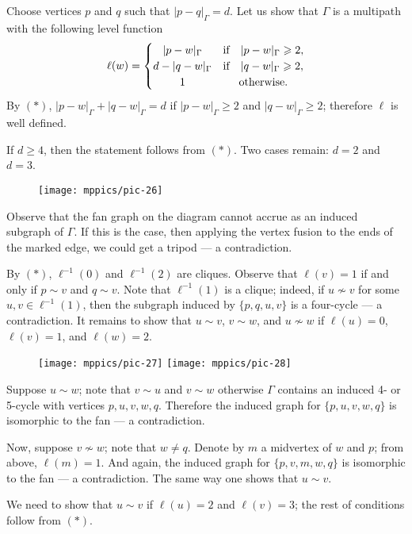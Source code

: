 \documentclass{article}
\def\parit#1{\medskip\noindent{\it #1}}
\begin{document}
Choose vertices $p$ and $q$ such that $|p-q|_\Gamma=d$.
Let us show that $\Gamma$ is a multipath with the following level function
\[\ell(w)=
\begin{cases}
\hfil |p-w|_\Gamma&\text{if}\quad |p-w|_\Gamma\geqslant 2,
\\
d-|q-w|_\Gamma&\text{if}\quad |q-w|_\Gamma\geqslant 2,
\\
\hfil 1&\hfil\text{otherwise.}
\end{cases}
\]
By $({*})$, $|p-w|_\Gamma+|q-w|_\Gamma=d$ if $|p-w|_\Gamma\geqslant 2$ and $|q-w|_\Gamma\geqslant 2$;
therefore $\ell$ is well defined.

If $d\geqslant 4$, then the statement follows from $({*})$.
Two cases remain: $d=2$ and $d=3$.

\begin{wrapfigure}{r}{17 mm}
\vskip-6mm
\centering
\texttt{[image: mppics/pic-26]}
\vskip-2mm
\end{wrapfigure}

Observe that the fan graph on the diagram cannot accrue as an induced subgraph of $\Gamma$.
If this is the case, then applying the vertex fusion to the ends of the marked edge, we could get a tripod --- a contradiction.

\parit{Case $d=2$.}
By $({*})$, $\ell^{-1}(0)$ and $\ell^{-1}(2)$ are cliques.
Observe that $\ell(v)=1$ if and only if $p\sim v$ and $q\sim v$.
Note that $\ell^{-1}(1)$ is a clique;
indeed, if $u\nsim v$ for some $u,v\in\ell^{-1}(1)$,
then the subgraph induced by $\{p,q,u,v\}$ is a four-cycle --- a contradiction.
It remains to show that $u\sim v$, $v\sim w$, and $u\nsim w$ if $\ell(u)=0$, $\ell(v)=1$, and $\ell(w)=2$.

\begin{wrapfigure}{r}{17 mm}
\vskip-2mm
\centering
\texttt{[image: mppics/pic-27]}
\vskip4mm
\texttt{[image: mppics/pic-28]}
\end{wrapfigure}

Suppose $u\sim w$; note that $v\sim u$ and $v\sim w$ otherwise $\Gamma$ contains an induced 4- or 5-cycle with vertices $p, u, v, w, q$.
Therefore the induced graph for $\{p,u,v,w,q\}$ is isomorphic to the fan --- a contradiction.

Now, suppose $v\nsim w$; note that $w\ne q$.
Denote by $m$ a midvertex of $w$ and $p$;
from above, $\ell(m)=1$.
And again, the induced graph for $\{p,v,m,w,q\}$ is isomorphic to the fan --- a contradiction.
The same way one shows that $u\sim v$.

\parit{Case $d=3$.}
We need to show that $u\sim v$ if $\ell(u)=2$ and $\ell(v)=3$;
the rest of conditions follow from $({*})$.
\end{document}
